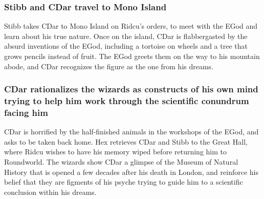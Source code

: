 \subsubsection{\Gls{Stibb} and \Gls{CDar} travel to Mono Island}
\Gls{Stibb} takes \Gls{CDar} to Mono Island on \Gls{Ridcu}'s orders, to meet with the \Gls{EGod} and
learn about his true nature. Once on the island, \Gls{CDar} is flabbergasted by the absurd
inventions of the \Gls{EGod}, including a tortoise on wheels and a tree that grows pencils instead
of fruit. The \Gls{EGod} greets them on the way to his mountain abode, and \Gls{CDar} recognizes the
figure as the one from his dreams.

\subsubsection{\Gls{CDar} rationalizes the wizards as constructs of his own mind trying to help
    him work through the scientific conundrum facing him}
\Gls{CDar} is horrified by the half-finished animals in the workshops of the \Gls{EGod}, and asks
to be taken back home. \Gls{Hex} retrieves \Gls{CDar} and \Gls{Stibb} to the Great Hall, where
\Gls{Ridcu} wishes to have his memory wiped before returning him to Roundworld. The wizards show
\Gls{CDar} a glimpse of the Museum of Natural History that is opened a few decades after his death
in London, and reinforce his belief that they are figments of his psyche trying to guide him to a
scientific conclusion within his dreams.